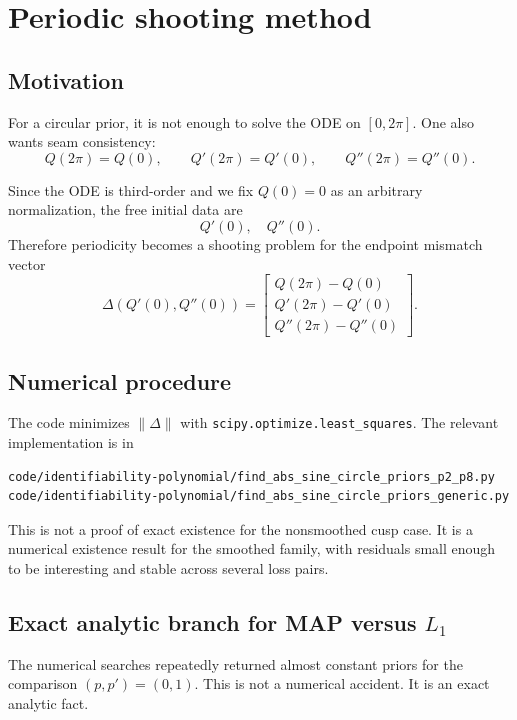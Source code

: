 \documentclass[11pt]{article}
\begin{document}
\section{Periodic shooting method}

\subsection{Motivation}

For a circular prior, it is not enough to solve the ODE on $[0,2\pi]$. One also wants seam consistency:
\[
Q(2\pi)=Q(0),\qquad
Q'(2\pi)=Q'(0),\qquad
Q''(2\pi)=Q''(0).
\]

Since the ODE is third-order and we fix $Q(0)=0$ as an arbitrary normalization, the free initial data are
\[
Q'(0),\quad Q''(0).
\]
Therefore periodicity becomes a shooting problem for the endpoint mismatch vector
\[
\Delta(Q'(0),Q''(0))
=
\begin{bmatrix}
Q(2\pi)-Q(0) \\
Q'(2\pi)-Q'(0) \\
Q''(2\pi)-Q''(0)
\end{bmatrix}.
\]

\subsection{Numerical procedure}

The code minimizes $\|\Delta\|$ with \texttt{scipy.optimize.least\_squares}. The relevant implementation is in
\begin{Verbatim}[fontsize=\small]
code/identifiability-polynomial/find_abs_sine_circle_priors_p2_p8.py
code/identifiability-polynomial/find_abs_sine_circle_priors_generic.py
\end{Verbatim}

This is not a proof of exact existence for the nonsmoothed cusp case. It is a numerical existence result for the smoothed family, with residuals small enough to be interesting and stable across several loss pairs.

\subsection{Exact analytic branch for MAP versus $L_1$}

The numerical searches repeatedly returned almost constant priors for the comparison $(p,p')=(0,1)$. This is not a numerical accident. It is an exact analytic fact.
\end{document}
